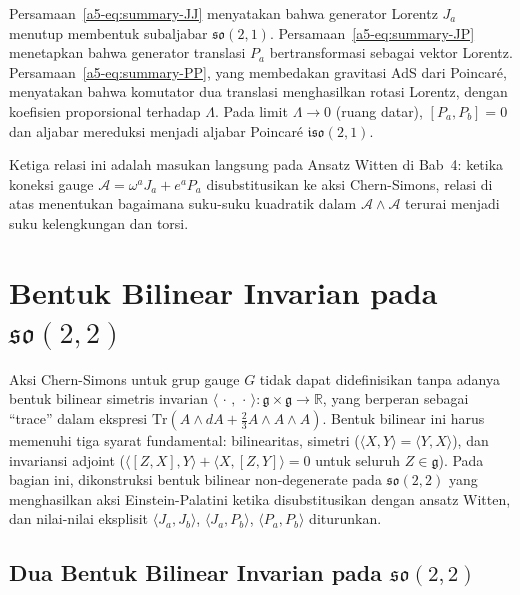 Persamaan~\eqref{a5-eq:summary-JJ} menyatakan bahwa generator Lorentz $J_a$ menutup membentuk subaljabar $\mathfrak{so}(2,1)$. Persamaan~\eqref{a5-eq:summary-JP} menetapkan bahwa generator translasi $P_a$ bertransformasi sebagai vektor Lorentz. Persamaan~\eqref{a5-eq:summary-PP}, yang membedakan gravitasi AdS dari Poincar\'{e}, menyatakan bahwa komutator dua translasi menghasilkan rotasi Lorentz, dengan koefisien proporsional terhadap $\Lambda$. Pada limit $\Lambda \to 0$ (ruang datar), $[P_a, P_b] = 0$ dan aljabar mereduksi menjadi aljabar Poincar\'{e} $\mathfrak{iso}(2,1)$.

Ketiga relasi ini adalah masukan langsung pada Ansatz Witten di Bab~4: ketika koneksi gauge $\mathcal{A} = \omega^a J_a + e^a P_a$ disubstitusikan ke aksi Chern-Simons, relasi di atas menentukan bagaimana suku-suku kuadratik dalam $\mathcal{A} \wedge \mathcal{A}$ terurai menjadi suku kelengkungan dan torsi.

\section{Bentuk Bilinear Invarian pada $\mathfrak{so}(2,2)$}
\label{app:bilinear-form}

Aksi Chern-Simons untuk grup gauge $G$ tidak dapat didefinisikan tanpa adanya bentuk bilinear simetris invarian $\langle\,\cdot\,,\,\cdot\,\rangle : \mathfrak{g} \times \mathfrak{g} \to \mathbb{R}$, yang berperan sebagai ``trace'' dalam ekspresi $\mathrm{Tr}(A \wedge dA + \frac{2}{3}A \wedge A \wedge A)$. Bentuk bilinear ini harus memenuhi tiga syarat fundamental: bilinearitas, simetri ($\langle X, Y\rangle = \langle Y, X\rangle$), dan invariansi adjoint ($\langle [Z, X], Y\rangle + \langle X, [Z, Y]\rangle = 0$ untuk seluruh $Z \in \mathfrak{g}$). Pada bagian ini, dikonstruksi bentuk bilinear non-degenerate pada $\mathfrak{so}(2,2)$ yang menghasilkan aksi Einstein-Palatini ketika disubstitusikan dengan ansatz Witten, dan nilai-nilai eksplisit $\langle J_a, J_b\rangle$, $\langle J_a, P_b\rangle$, $\langle P_a, P_b\rangle$ diturunkan.

\subsection{Dua Bentuk Bilinear Invarian pada $\mathfrak{so}(2,2)$}
\label{app:bilinear-two}

